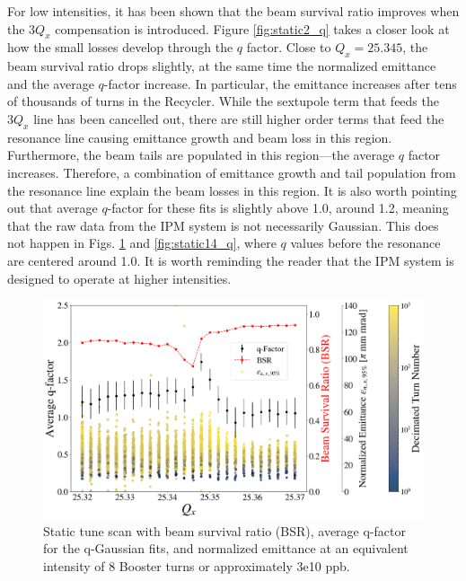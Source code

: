 For low intensities, it has been shown that the beam survival ratio improves when the $3Q_x$ compensation is introduced. Figure \ref{fig:static2_q} takes a closer look at how the small losses develop through the $q$ factor. Close to $Q_x=25.345$, the beam survival ratio drops slightly, at the same time the normalized emittance and the average $q$-factor increase. In particular, the emittance increases after tens of thousands of turns in the Recycler. While the sextupole term that feeds the $3Q_x$ line has been cancelled out, there are still higher order terms that feed the resonance line causing emittance growth and beam loss in this region. Furthermore, the beam tails are populated in this region---the average $q$ factor increases. Therefore, a combination of emittance growth and tail population from the resonance line explain the beam losses in this region. It is also worth pointing out that average $q$-factor for these fits is slightly above 1.0, around 1.2, meaning that the raw data from the IPM system is not necessarily Gaussian. This does not happen in Figs. \ref{fig:static8_q} and \ref{fig:static14_q}, where $q$ values before the resonance are centered around 1.0. It is worth reminding the reader that the IPM system is designed to operate at higher intensities. 

\begin{figure}[H]
    \centering
    \includegraphics[width=\columnwidth]{chapter6/static8turns_emittance_dampersOFF.png}
    \caption{Static tune scan with beam survival ratio (BSR), average q-factor for the q-Gaussian fits, and normalized emittance at an equivalent intensity of 8 Booster turns or approximately 3e10 ppb.}
    \label{fig:static8_q}
\end{figure}

